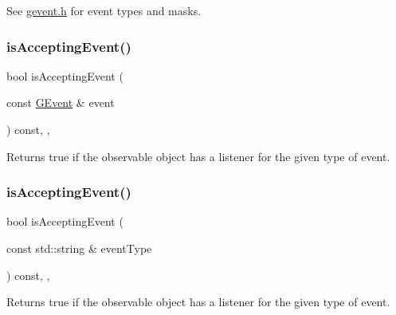 See \mbox{\hyperlink{gevent_8h_source}{gevent.\+h}} for event types and masks. \mbox{\label{classGObservable_aa31c73145a29dcb92848a92e0cfaea41}} 
\subsubsection{\texorpdfstring{is\+Accepting\+Event()}{isAcceptingEvent()}\hspace{0.1cm}{\footnotesize\ttfamily [2/3]}}
{\footnotesize\ttfamily bool is\+Accepting\+Event (\begin{DoxyParamCaption}\item[{const \mbox{\hyperlink{classGEvent}{G\+Event}} \&}]{event }\end{DoxyParamCaption}) const\hspace{0.3cm}{\ttfamily [protected]}, {\ttfamily [virtual]}, {\ttfamily [inherited]}}



Returns true if the observable object has a listener for the given type of event. 

\mbox{\label{classGObservable_a3b1c689267eda44e65a2213e7de38b23}} 
\subsubsection{\texorpdfstring{is\+Accepting\+Event()}{isAcceptingEvent()}\hspace{0.1cm}{\footnotesize\ttfamily [3/3]}}
{\footnotesize\ttfamily bool is\+Accepting\+Event (\begin{DoxyParamCaption}\item[{const std\+::string \&}]{event\+Type }\end{DoxyParamCaption}) const\hspace{0.3cm}{\ttfamily [protected]}, {\ttfamily [virtual]}, {\ttfamily [inherited]}}



Returns true if the observable object has a listener for the given type of event. 

\mbox{\label{classGBrowserPane_a012b5afb54e037e6c5498cf0932a521b}} 
